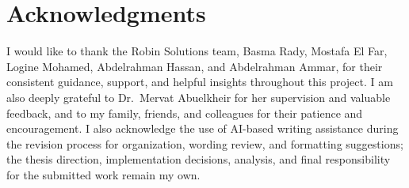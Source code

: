 \chapter*{Acknowledgments}
\label{chap:ack}
I would like to thank the Robin Solutions team, Basma Rady, Mostafa El Far, Logine Mohamed, Abdelrahman Hassan, and Abdelrahman Ammar, for their consistent guidance, support, and helpful insights throughout this project. I am also deeply grateful to Dr.\ Mervat Abuelkheir for her supervision and valuable feedback, and to my family, friends, and colleagues for their patience and encouragement. I also acknowledge the use of AI-based writing assistance during the revision process for organization, wording review, and formatting suggestions; the thesis direction, implementation decisions, analysis, and final responsibility for the submitted work remain my own.
